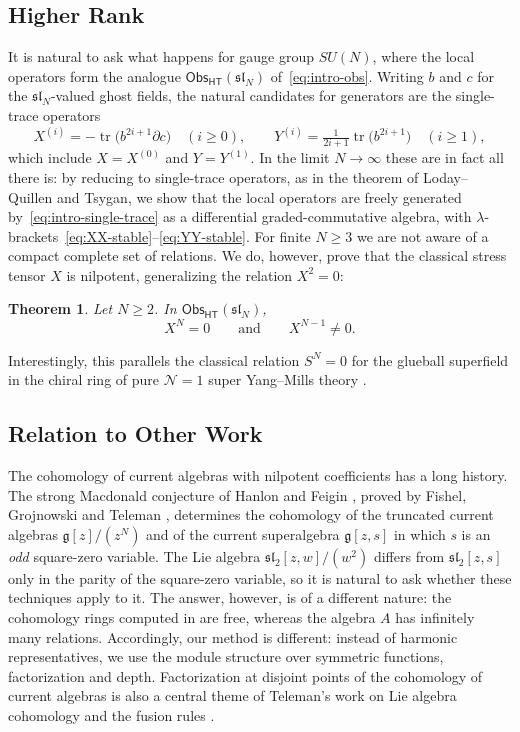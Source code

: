 \documentclass[11pt]{amsart}
\numberwithin{equation}{section}
\newtheorem{theorem}{Theorem}[section]
\theoremstyle{definition}
\theoremstyle{remark}
\newcommand{\g}{\mathfrak{g}}
\newcommand{\sltwo}{\mathfrak{sl}_2}
\newcommand{\dd}{\partial}
\newcommand{\Obs}{\mathsf{Obs}_{\mathsf{HT}}}
\begin{document}
\subsection{Higher Rank}\label{subsec:higher-intro}
It is natural to ask what happens for gauge group $SU(N)$, where the local operators form the analogue $\Obs(\mathfrak{sl}_N)$ of~\eqref{eq:intro-obs}. Writing $b$ and $c$ for the $\mathfrak{sl}_N$-valued ghost fields, the natural candidates for generators are the single-trace operators
\begin{equation}\label{eq:intro-single-trace}
X^{(i)}=-\operatorname{tr}\bigl(b^{2i+1}\dd c\bigr)\quad(i\ge0),\qquad Y^{(i)}=\tfrac1{2i+1}\operatorname{tr}\bigl(b^{2i+1}\bigr)\quad(i\ge1),
\end{equation}
which include $X=X^{(0)}$ and $Y=Y^{(1)}$. In the limit $N\to\infty$ these are in fact all there is: by reducing to single-trace operators, as in the theorem of Loday--Quillen and Tsygan, we show that the local operators are freely generated by~\eqref{eq:intro-single-trace} as a differential graded-commutative algebra, with $\lambda$-brackets~\eqref{eq:XX-stable}--\eqref{eq:YY-stable}. For finite $N\ge3$ we are not aware of a compact complete set of relations. We do, however, prove that the classical stress tensor $X$ is nilpotent, generalizing the relation $X^2=0$:

\begin{theorem}\label{thm:intro-XN}
Let $N\ge2$. In $\Obs(\mathfrak{sl}_N)$,
\begin{equation}\label{eq:intro-XN}
X^N=0\qquad\text{and}\qquad X^{N-1}\ne0.
\end{equation}
\end{theorem}

Interestingly, this parallels the classical relation $S^N=0$ for the glueball superfield in the chiral ring of pure $\mathcal N=1$ super Yang--Mills theory \cite{CDSW02}.

\subsection{Relation to Other Work}
The cohomology of current algebras with nilpotent coefficients has a long history. The strong Macdonald conjecture of Hanlon and Feigin \cite{Han90,Fei88}, proved by Fishel, Grojnowski and Teleman \cite{FGT08}, determines the cohomology of the truncated current algebras $\g[z]/(z^N)$ and of the current superalgebra $\g[z,s]$ in which $s$ is an \emph{odd} square-zero variable. The Lie algebra $\sltwo[z,w]/(w^2)$ differs from $\sltwo[z,s]$ only in the parity of the square-zero variable, so it is natural to ask whether these techniques apply to it. The answer, however, is of a different nature: the cohomology rings computed in \cite{FGT08} are free, whereas the algebra $A$ has infinitely many relations. Accordingly, our method is different: instead of harmonic representatives, we use the module structure over symmetric functions, factorization and depth. Factorization at disjoint points of the cohomology of current algebras is also a central theme of Teleman's work on Lie algebra cohomology and the fusion rules \cite{Tel95,Tel96}.
\end{document}
